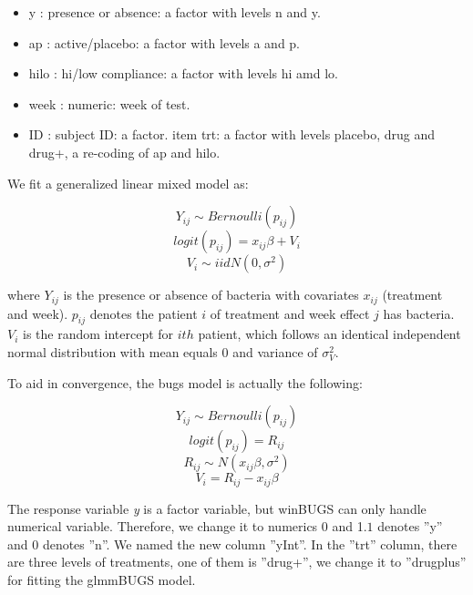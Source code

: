 \documentclass{article}
\begin{document}
\begin{itemize}
\item y : presence or absence: a factor with levels n and y. 
\item ap : active/placebo: a factor with levels a and p. 
\item hilo : hi/low compliance: a factor with levels hi amd lo. 
\item week : numeric: week of test. 
\item ID : subject ID: a factor. 
item trt: a factor with levels placebo, drug and drug+, a re-coding of ap and hilo. 
\end{itemize} 

We fit a generalized linear mixed model as: 

\[Y_{ij} \sim  Bernoulli(p_{ij})\]
\[logit(p_{ij}) = x_{ij}\beta + V_{i}\]
\[V_{i} \sim iid N(0, \sigma^2)\] 

where $Y_{ij}$ is the presence or absence of bacteria with covariates $x_{ij}$ (treatment and week).  
$p_{ij}$ denotes the patient $i$ of treatment and week effect $j$ has bacteria.
$V_i$ is the random intercept for $ith$ patient, which follows an identical independent normal distribution with mean equals 0 and variance of $\sigma_V^2$.


To aid in convergence, the bugs model is actually the following:

\[Y_{ij} \sim  Bernoulli(p_{ij})\]
\[logit(p_{ij}) = R_{ij}\]
\[R_{ij} \sim N(x_{ij}\beta, \sigma^2)\]
\[V_{i} = R_{ij} - x_{ij}\beta \] 

The response variable \textit{y} is a factor variable, but winBUGS can only handle numerical variable. Therefore, we change it to numerics 0 and 1.$1$ denotes ''y'' and 0 denotes ''n''. We named the new column ''yInt''.  In the ''trt'' column, there are three 
levels of treatments, one of them is ''drug+'', we change it to ''drugplus'' for fitting the glmmBUGS model.

\begin{Schunk}
\end{Schunk}
\end{document}
